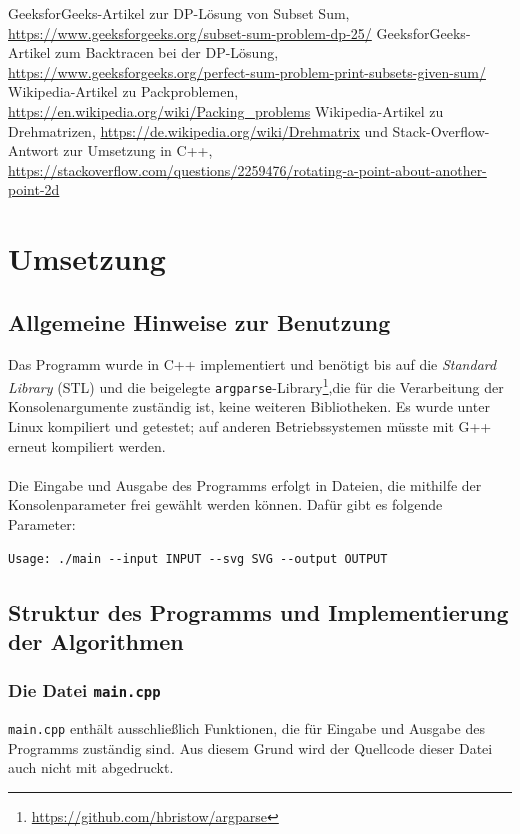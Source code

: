 \documentclass[a4paper, notitlepage, 12pt]{scrartcl}
\begin{document}
\begin{thebibliography}{xx}
	 GeeksforGeeks-Artikel zur DP-Lösung von Subset Sum, \url{https://www.geeksforgeeks.org/subset-sum-problem-dp-25/}
	 GeeksforGeeks-Artikel zum Backtracen bei der DP-Lösung, \url{https://www.geeksforgeeks.org/perfect-sum-problem-print-subsets-given-sum/}
	 Wikipedia-Artikel zu Packproblemen, \url{https://en.wikipedia.org/wiki/Packing_problems}
	 Wikipedia-Artikel zu Drehmatrizen, \url{https://de.wikipedia.org/wiki/Drehmatrix} und Stack-Overflow-Antwort zur Umsetzung in C++, \url{https://stackoverflow.com/questions/2259476/rotating-a-point-about-another-point-2d}
\end{thebibliography}
\section{Umsetzung}
\subsection{Allgemeine Hinweise zur Benutzung}
Das Programm wurde in C++ implementiert und benötigt bis auf die \textit{Standard Library} (STL) und die beigelegte \texttt{argparse}-Library\footnote{\url{https://github.com/hbristow/argparse}},die für die Verarbeitung der Konsolenargumente zuständig ist, keine weiteren Bibliotheken. Es wurde unter Linux kompiliert und getestet; auf anderen Betriebssystemen müsste mit G++ erneut kompiliert werden. \\ \\
Die Eingabe und Ausgabe des Programms erfolgt in Dateien, die mithilfe der Konsolenparameter frei gewählt werden können. Dafür gibt es folgende Parameter:
\begin{verbatim}
Usage: ./main --input INPUT --svg SVG --output OUTPUT
\end{verbatim}
\subsection{Struktur des Programms und Implementierung der Algorithmen}
\subsubsection{Die Datei \texttt{main.cpp}}
\texttt{main.cpp} enthält ausschließlich Funktionen, die für Eingabe und Ausgabe des Programms zuständig sind. Aus diesem Grund wird der Quellcode dieser Datei auch nicht mit abgedruckt.
\end{document}
